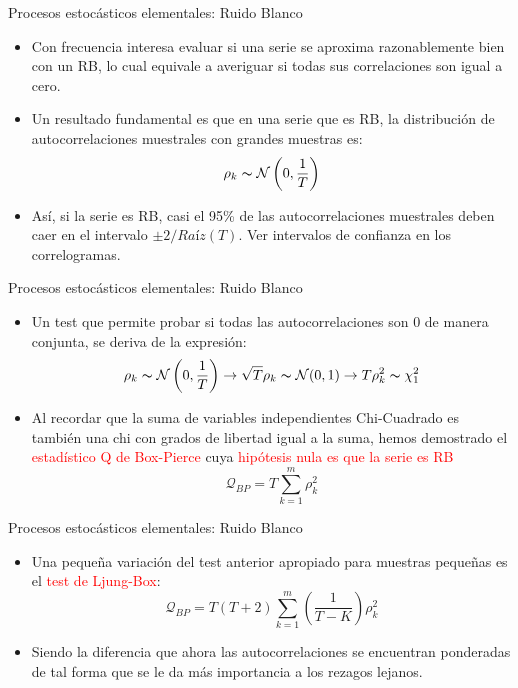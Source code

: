 \begin{frame}{Procesos estocásticos elementales: Ruido Blanco}
	\begin{itemize}
		\item Con frecuencia interesa evaluar si una serie se aproxima razonablemente bien con un RB, lo cual equivale a averiguar si todas sus correlaciones son igual a cero.
		\item Un resultado fundamental es que en una serie que es RB, la distribución de autocorrelaciones muestrales con grandes muestras es:
			$$\rho_k \thicksim \mathcal{N}\left(0, \frac{1}{T} \right) $$
		\item Así, si la serie es RB, casi el 95\% de las autocorrelaciones muestrales deben caer en el intervalo $\pm 2/Raíz(T)$. Ver intervalos de confianza en los correlogramas.
	\end{itemize}
\end{frame}
\begin{frame}{Procesos estocásticos elementales: Ruido Blanco}
	\begin{itemize}
		\item Un test que permite probar si todas las autocorrelaciones son 0 de manera conjunta, se deriva de la expresión:
			$$\rho_k \thicksim \mathcal{N}\left(0, \frac{1}{T} \right) \rightarrow \sqrt{T}\rho_k \thicksim \mathcal{N}(0,1) \rightarrow T\rho_k^2 \thicksim \chi_1^2$$
		\item Al recordar que la suma de variables independientes Chi-Cuadrado es también una chi con grados de libertad igual a la suma, hemos demostrado el \textcolor{red}{estadístico Q de Box-Pierce} cuya \textcolor{red}{hipótesis nula es que la serie es RB}
			$$\mathcal{Q}_{BP} = T\sum_{k=1}^{m}\rho_k^2$$
	\end{itemize}
\end{frame}
\begin{frame}{Procesos estocásticos elementales: Ruido Blanco}
	\begin{itemize}
		\item  Una pequeña variación del test anterior apropiado para muestras pequeñas es el \textcolor{red}{test de Ljung-Box}:
			$$\mathcal{Q}_{BP} = T(T+2)\sum_{k=1}^{m}\left(\frac{1}{T-K} \right) \rho_k^2$$
		\item Siendo la diferencia que ahora las autocorrelaciones se encuentran ponderadas de tal forma que se le da más importancia a los rezagos lejanos.
	\end{itemize}
\end{frame}
